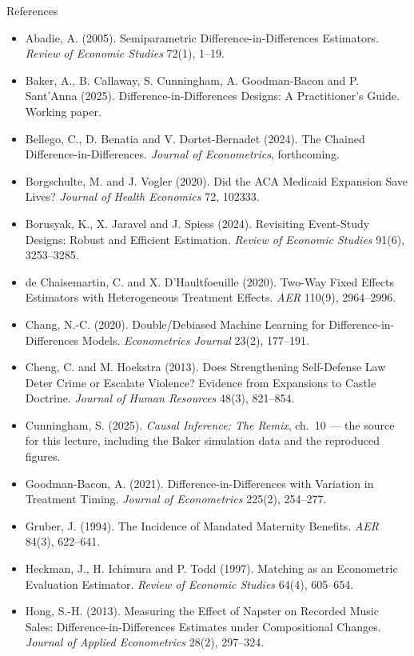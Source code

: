 \documentclass[
  11pt,
  ignorenonframetext,
  aspectratio=169,
]{beamer}
\providecommand{\tightlist}{%
  \setlength{\itemsep}{0pt}\setlength{\parskip}{0pt}}
\begin{document}
\begin{frame}{References}
\protect{}\label{references}
\tiny

\begin{itemize}
\tightlist
\item
  Abadie, A. (2005). Semiparametric Difference-in-Differences
  Estimators. \emph{Review of Economic Studies} 72(1), 1--19.
\item
  Baker, A., B. Callaway, S. Cunningham, A. Goodman-Bacon and P.
  Sant'Anna (2025). Difference-in-Differences Designs: A Practitioner's
  Guide. Working paper.
\item
  Bellego, C., D. Benatia and V. Dortet-Bernadet (2024). The Chained
  Difference-in-Differences. \emph{Journal of Econometrics},
  forthcoming.
\item
  Borgschulte, M. and J. Vogler (2020). Did the ACA Medicaid Expansion
  Save Lives? \emph{Journal of Health Economics} 72, 102333.
\item
  Borusyak, K., X. Jaravel and J. Spiess (2024). Revisiting Event-Study
  Designs: Robust and Efficient Estimation. \emph{Review of Economic
  Studies} 91(6), 3253--3285.
\item
  de Chaisemartin, C. and X. D'Haultfoeuille (2020). Two-Way Fixed
  Effects Estimators with Heterogeneous Treatment Effects. \emph{AER}
  110(9), 2964--2996.
\item
  Chang, N.-C. (2020). Double/Debiased Machine Learning for
  Difference-in-Differences Models. \emph{Econometrics Journal} 23(2),
  177--191.
\item
  Cheng, C. and M. Hoekstra (2013). Does Strengthening Self-Defense Law
  Deter Crime or Escalate Violence? Evidence from Expansions to Castle
  Doctrine. \emph{Journal of Human Resources} 48(3), 821--854.
\item
  Cunningham, S. (2025). \emph{Causal Inference: The Remix}, ch.~10 ---
  the source for this lecture, including the Baker simulation data and
  the reproduced figures.
\item
  Goodman-Bacon, A. (2021). Difference-in-Differences with Variation in
  Treatment Timing. \emph{Journal of Econometrics} 225(2), 254--277.
\item
  Gruber, J. (1994). The Incidence of Mandated Maternity Benefits.
  \emph{AER} 84(3), 622--641.
\item
  Heckman, J., H. Ichimura and P. Todd (1997). Matching as an
  Econometric Evaluation Estimator. \emph{Review of Economic Studies}
  64(4), 605--654.
\item
  Hong, S.-H. (2013). Measuring the Effect of Napster on Recorded Music
  Sales: Difference-in-Differences Estimates under Compositional
  Changes. \emph{Journal of Applied Econometrics} 28(2), 297--324.
\end{itemize}
\end{frame}
\end{document}
